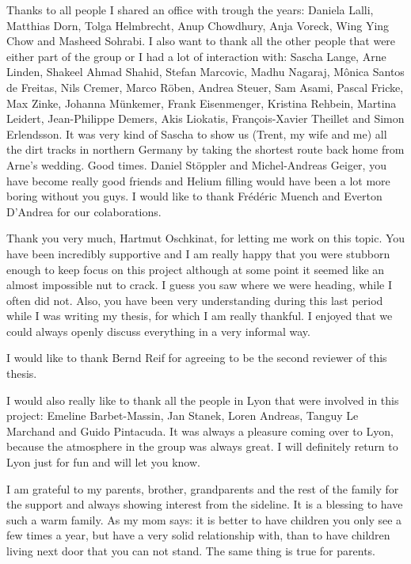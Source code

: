 Thanks to all people I shared an office with trough the years: Daniela Lalli, Matthias Dorn, Tolga Helmbrecht, Anup Chowdhury, Anja Voreck, Wing Ying Chow and Masheed Sohrabi. I also want to thank all the other people that were either part of the group or I had a lot of interaction with: Sascha Lange, Arne Linden, Shakeel Ahmad Shahid, Stefan Marcovic, Madhu Nagaraj, Mônica Santos de Freitas, Nils Cremer, Marco Röben, Andrea Steuer, Sam Asami, Pascal Fricke, Max Zinke, Johanna Münkemer, Frank Eisenmenger, Kristina Rehbein, Martina Leidert, Jean-Philippe Demers, Akis Liokatis, François-Xavier Theillet and Simon Erlendsson. It was very kind of Sascha to show us (Trent, my wife and me) all the dirt tracks in northern Germany by taking the shortest route back home from Arne's wedding. Good times. Daniel Stöppler and Michel-Andreas Geiger, you have become really good friends and Helium filling would have been a lot more boring without you guys. I would like to thank Frédéric Muench and Everton D'Andrea for our colaborations.

Thank you very much, Hartmut Oschkinat, for letting me work on this topic. You have been incredibly supportive and I am really happy that you were stubborn enough to keep focus on this project although at some point it seemed like an almost impossible nut to crack. I guess you saw where we were heading, while I often did not. Also, you have been very understanding during this last period while I was writing my thesis, for which I am really thankful. I enjoyed that we could always openly discuss everything in a very informal way.

I would like to thank Bernd Reif for agreeing to be the second reviewer of this thesis.

I would also really like to thank all the people in Lyon that were involved in this project: Emeline Barbet-Massin, Jan Stanek, Loren Andreas, Tanguy Le Marchand and Guido Pintacuda. It was always a pleasure coming over to Lyon, because the atmosphere in the group was always great. I will definitely return to Lyon just for fun and will let you know.

I am grateful to my parents, brother, grandparents and the rest of the family for the support and always showing interest from the sideline. It is a blessing to have such a warm family. As my mom says: it is better to have children you only see a few times a year, but have a very solid relationship with, than to have children living next door that you can not stand. The same thing is true for parents.

